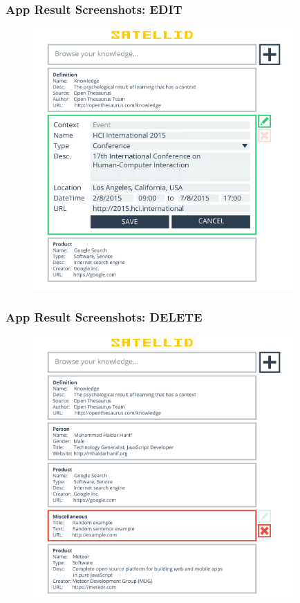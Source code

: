 \documentclass[10pt, compress]{beamer}
\begin{document}

\begin{frame}[fragile]
  \frametitle{App Result Screenshots: EDIT}

  \begin{figure}[ht]
    \centering
    \vspace{-1cm}
    \includegraphics[height=10cm]{include/satellid-app-results_edit.png}
    \label{fig:satellid-app-results_edit}
  \end{figure}

\end{frame}


\begin{frame}[fragile]
  \frametitle{App Result Screenshots: DELETE}

  \begin{figure}[ht]
    \centering
    \vspace{-1cm}
    \includegraphics[height=10cm]{include/satellid-app-results_delete.png}
    \vspace{-10pt}
    \label{fig:satellid-app-results_delete}
  \end{figure}

\end{frame}
\end{document}
